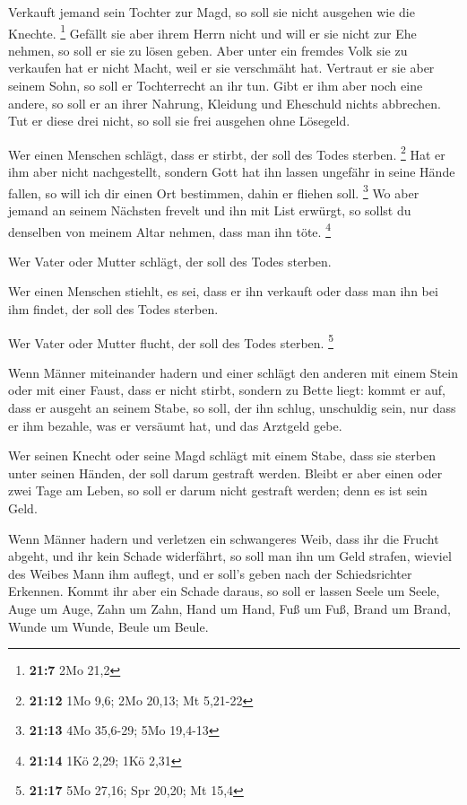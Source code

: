  Verkauft jemand sein Tochter zur Magd, so soll sie nicht
ausgehen wie die Knechte. \footnote{\textbf{21:7} 2Mo 21,2} 
Gefällt sie aber ihrem Herrn nicht und will er sie nicht zur Ehe nehmen,
so soll er sie zu lösen geben. Aber unter ein fremdes Volk sie zu
verkaufen hat er nicht Macht, weil er sie verschmäht hat. 
Vertraut er sie aber seinem Sohn, so soll er Tochterrecht an ihr tun.
 Gibt er ihm aber noch eine andere, so soll er an ihrer
Nahrung, Kleidung und Eheschuld nichts abbrechen.  Tut er
diese drei nicht, so soll sie frei ausgehen ohne Lösegeld.

 Wer einen Menschen schlägt, dass er stirbt, der soll des
Todes sterben. \footnote{\textbf{21:12} 1Mo 9,6; 2Mo 20,13; Mt 5,21-22}
 Hat er ihm aber nicht nachgestellt, sondern Gott hat ihn
lassen ungefähr in seine Hände fallen, so will ich dir einen Ort
bestimmen, dahin er fliehen soll. \footnote{\textbf{21:13} 4Mo 35,6-29;
  5Mo 19,4-13}  Wo aber jemand an seinem Nächsten frevelt
und ihn mit List erwürgt, so sollst du denselben von meinem Altar
nehmen, dass man ihn töte. \footnote{\textbf{21:14} 1Kö 2,29; 1Kö 2,31}

 Wer Vater oder Mutter schlägt, der soll des Todes sterben.

 Wer einen Menschen stiehlt, es sei, dass er ihn verkauft
oder dass man ihn bei ihm findet, der soll des Todes sterben.

 Wer Vater oder Mutter flucht, der soll des Todes sterben.
\footnote{\textbf{21:17} 5Mo 27,16; Spr 20,20; Mt 15,4}

 Wenn Männer miteinander hadern und einer schlägt den
anderen mit einem Stein oder mit einer Faust, dass er nicht stirbt,
sondern zu Bette liegt:  kommt er auf, dass er ausgeht an
seinem Stabe, so soll, der ihn schlug, unschuldig sein, nur dass er ihm
bezahle, was er versäumt hat, und das Arztgeld gebe.

 Wer seinen Knecht oder seine Magd schlägt mit einem Stabe,
dass sie sterben unter seinen Händen, der soll darum gestraft werden.
 Bleibt er aber einen oder zwei Tage am Leben, so soll er
darum nicht gestraft werden; denn es ist sein Geld.

 Wenn Männer hadern und verletzen ein schwangeres Weib,
dass ihr die Frucht abgeht, und ihr kein Schade widerfährt, so soll man
ihn um Geld strafen, wieviel des Weibes Mann ihm auflegt, und er soll's
geben nach der Schiedsrichter Erkennen.  Kommt ihr aber ein
Schade daraus, so soll er lassen Seele um Seele,  Auge um
Auge, Zahn um Zahn, Hand um Hand, Fuß um Fuß,  Brand um
Brand, Wunde um Wunde, Beule um Beule.

